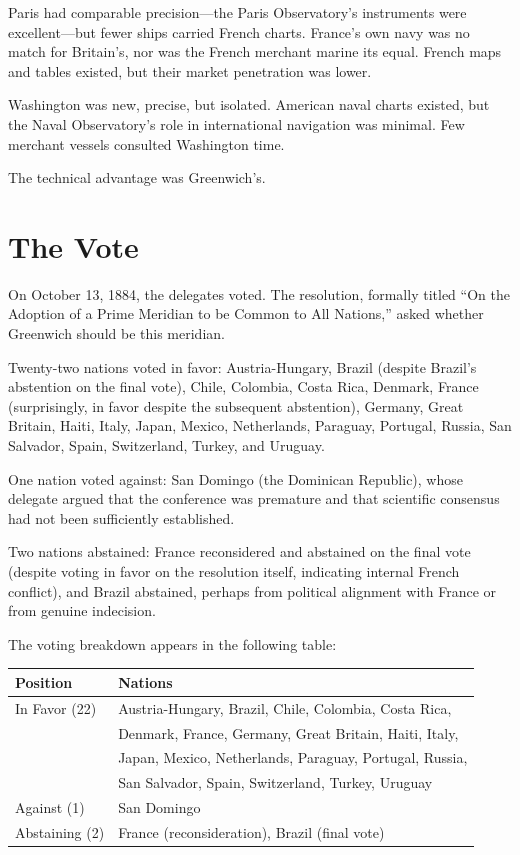 Paris had comparable precision---the Paris Observatory's instruments were excellent---but fewer ships carried French charts. France's own navy was no match for Britain's, nor was the French merchant marine its equal. French maps and tables existed, but their market penetration was lower.

Washington was new, precise, but isolated. American naval charts existed, but the Naval Observatory's role in international navigation was minimal. Few merchant vessels consulted Washington time.

The technical advantage was Greenwich's.

\section{The Vote}

On October 13, 1884, the delegates voted. The resolution, formally titled ``On the Adoption of a Prime Meridian to be Common to All Nations,'' asked whether Greenwich should be this meridian.

Twenty-two nations voted in favor: Austria-Hungary, Brazil (despite Brazil's abstention on the final vote), Chile, Colombia, Costa Rica, Denmark, France (surprisingly, in favor despite the subsequent abstention), Germany, Great Britain, Haiti, Italy, Japan, Mexico, Netherlands, Paraguay, Portugal, Russia, San Salvador, Spain, Switzerland, Turkey, and Uruguay.

One nation voted against: San Domingo (the Dominican Republic), whose delegate argued that the conference was premature and that scientific consensus had not been sufficiently established.

Two nations abstained: France reconsidered and abstained on the final vote (despite voting in favor on the resolution itself, indicating internal French conflict), and Brazil abstained, perhaps from political alignment with France or from genuine indecision.

The voting breakdown appears in the following table:

\begin{center}
\begin{tabularx}{\linewidth}{lX}
\hline
\textbf{Position} & \textbf{Nations} \\
\hline
In Favor (22) & Austria-Hungary, Brazil, Chile, Colombia, Costa Rica, \\
 & Denmark, France, Germany, Great Britain, Haiti, Italy, \\
 & Japan, Mexico, Netherlands, Paraguay, Portugal, Russia, \\
 & San Salvador, Spain, Switzerland, Turkey, Uruguay \\
Against (1) & San Domingo \\
Abstaining (2) & France (reconsideration), Brazil (final vote) \\
\hline
\end{tabularx}
\end{center}

